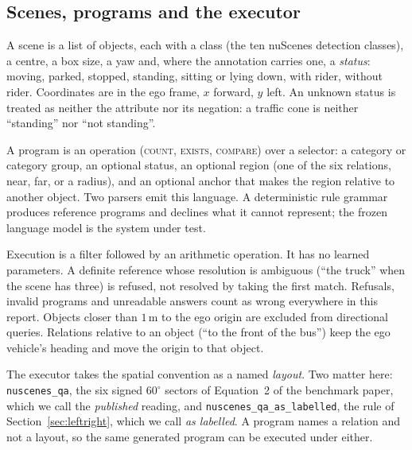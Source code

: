 \documentclass[11pt,a4paper]{article}
\newcommand{\code}[1]{\texttt{\small #1}}
\begin{document}
\subsection{Scenes, programs and the executor}

A scene is a list of objects, each with a class (the ten nuScenes detection
classes), a centre, a box size, a yaw and, where the annotation carries one,
a \emph{status}: moving, parked, stopped, standing, sitting or lying down,
with rider, without rider. Coordinates are in the ego frame, $x$ forward,
$y$ left. An unknown status is treated as neither the attribute nor its
negation: a traffic cone is neither ``standing'' nor ``not standing''.

A program is an operation (\textsc{count}, \textsc{exists},
\textsc{compare}) over a selector: a category or category group, an optional
status, an optional region (one of the six relations, near, far, or a
radius), and an optional anchor that makes the region relative to another
object. Two parsers emit this language. A deterministic rule grammar produces
reference programs and declines what it cannot represent; the frozen language
model is the system under test.

Execution is a filter followed by an arithmetic operation. It has no learned
parameters. A definite reference whose resolution is ambiguous (``the
truck'' when the scene has three) is refused, not resolved by taking the
first match. Refusals, invalid programs and unreadable answers count as wrong
everywhere in this report. Objects closer than $1$\,m to the ego origin are
excluded from directional queries. Relations relative to an object (``to the
front of the bus'') keep the ego vehicle's heading and move the origin to
that object.

The executor takes the spatial convention as a named \emph{layout}. Two
matter here: \code{nuscenes\_qa}, the six signed $60^{\circ}$ sectors of
Equation~2 of the benchmark paper, which we call the \emph{published}
reading, and \code{nuscenes\_qa\_as\_labelled}, the rule of
Section~\ref{sec:leftright}, which we call \emph{as labelled}. A program
names a relation and not a layout, so the same generated program can be
executed under either.
\end{document}
